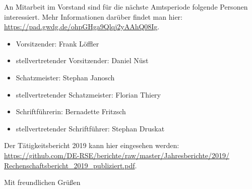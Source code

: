 \documentclass[../Vorlagen/de-RSE_Brief,a4paper]{scrlttr2}
\begin{document}
\begin{letter}{\mbox{}
}
\clearpage
An Mitarbeit im Vorstand sind für die nächste Amtsperiode folgende Personen interessiert. Mehr Informationen darüber findet man hier:\\
\href{https://pad.gwdg.de/ohpGHga9Qlqj2yAAhQ08Ig}{https://pad.gwdg.de/ohpGHga9Qlqj2yAAhQ08Ig}.
\begin{itemize}
 \item Vorsitzender: Frank Löffler
 \item stellvertretender Vorsitzender: Daniel Nüst
 \item Schatzmeister: Stephan Janosch
 \item stellvertretender Schatzmeister: Florian Thiery
 \item Schriftführerin: Bernadette Fritzsch
 \item stellvertretender Schriftführer: Stephan Druskat
\end{itemize}
Der Tätigkeitsbericht 2019 kann hier eingesehen werden:\\
\href{https://github.com/DE-RSE/berichte/raw/master/Jahresberichte/2019/Rechenschaftsbericht_2019_publiziert.pdf}{https://github.com/DE-RSE/berichte/raw/master/Jahresberichte/2019/\\Rechenschaftsbericht\_2019\_publiziert.pdf}.

\closing{Mit freundlichen Grüßen}
\end{letter}
\end{document}
